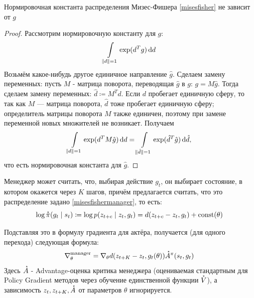 
\begin{proposition}
Нормировочная константа распределения Мизес-Фишера \eqref{misesfisher} не зависит от $g$
\begin{proof} Рассмотрим нормировочную константу для $g$:
$$\int\limits_{\|d\| = 1} \exp(d^Tg) \mathop{}\!\mathrm{d} d$$
Возьмём какое-нибудь другое единичное направление $\hat{g}$. Сделаем замену переменных: пусть $M$ - матрица поворота, переводящая $\hat{g}$ в $g$: $g = M \hat{g}$. Тогда сделаем замену переменных: $\hat{d} \coloneqq M^T d$. Если $d$ пробегает единичную сферу, то так как $M$ --- матрица поворота, $\hat{d}$ тоже пробегает единичную сферу; определитель матрицы поворота $M$ также единичен, поэтому при замене переменной новых множителей не возникает. Получаем
$$\int\limits_{\|d\| = 1} \exp(d^TM\hat{g}) \mathop{}\!\mathrm{d} d = \int\limits_{\|\hat{d}\| = 1} \exp(\hat{d}^T\hat{g}) \mathop{}\!\mathrm{d} \hat{d},$$
что есть нормировочная константа для $\hat{g}$.
\end{proof}
\end{proposition}

Менеджер может считать, что, выбирая действие $g_t$, он выбирает состояние, в котором окажется через $K$ шагов, причём предлагается считать, что это распределение задано \eqref{misesfishermanager}, то есть:
$$\log \accentset{\star}{\pi}(g_t \mid s_t) \coloneqq \log p(z_{t + c} \mid z_t, g_t) = d(z_{t+c} - z_t, g_t) + \operatorname{const}(\theta)$$

Подставляя это в формулу градиента для актёра, получается (для одного перехода) следующая формула:
$$\nabla_{\theta}^{\mathrm{manager}} = \nabla_{\theta} d(z_{t+K} - z_t, g_t(\theta)) \accentset{\star}{A}^{\pi}(s_t, g_t)$$
Здесь $\accentset{\star}{A}$ - Advantage-оценка критика менеджера (оцениваемая стандартным для Policy Gradient методов через обучение единственной функции $\accentset{\star}{V}$), а зависимость $z_t, z_{t+K}, \accentset{\star}{A}$ от параметров $\theta$ игнорируется.


